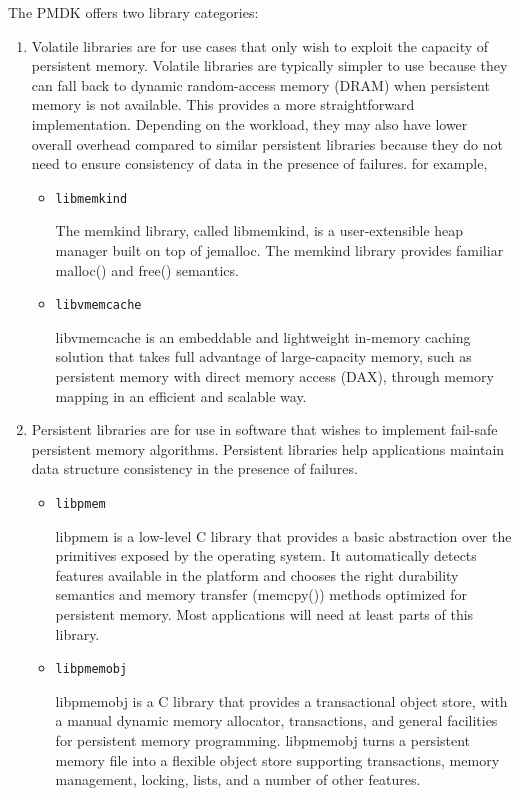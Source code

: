 \documentclass[11pt,swedish, openany, oneside]{book}
\begin{document}
The PMDK offers two library categories:
\vspace{-5pt}
\begin{enumerate}
    \item Volatile libraries are for use cases that only wish to exploit the capacity of persistent memory. Volatile libraries are typically simpler to use because they can fall back to dynamic random-access memory (DRAM) when persistent memory is not available. This provides a more straightforward implementation. Depending on the workload, they may also have lower overall overhead compared to similar persistent libraries because they do not need to ensure consistency of data in the presence of failures. for example,

    \begin{itemize}
        \item \texttt{libmemkind}

        The memkind library, called libmemkind, is a user-extensible heap manager built on top of jemalloc. The memkind library provides familiar malloc() and free() semantics.
        \item \texttt{libvmemcache}

        libvmemcache is an embeddable and lightweight in-memory caching solution that takes full advantage of large-capacity memory, such as persistent memory with direct memory access (DAX), through memory mapping in an efficient and scalable way.
    \end{itemize}
    \item Persistent libraries are for use in software that wishes to implement fail-safe persistent memory algorithms. Persistent libraries help applications maintain data structure consistency in the presence of failures.
\begin{itemize}
    \item \texttt{libpmem}
    
    libpmem is a low-level C library that provides a basic abstraction over the primitives exposed by the operating system. It automatically detects features available in the platform and chooses the right durability semantics and memory transfer (memcpy()) methods optimized for persistent memory. Most applications will need at least parts of this library.

    \item \texttt{libpmemobj}
    
    libpmemobj is a C library that provides a transactional object store, with a manual dynamic memory allocator, transactions, and general facilities for persistent memory programming. libpmemobj turns a persistent memory file into a flexible object store supporting transactions, memory management, locking, lists, and a number of other features.
    

\end{itemize}
\end{enumerate}
\end{document}
